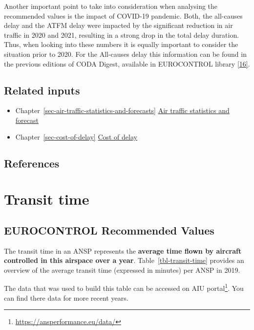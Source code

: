 \documentclass[
  11pt,
  a4paper,
]{book}
\providecommand{\tightlist}{%
  \setlength{\itemsep}{0pt}\setlength{\parskip}{0pt}}\usepackage{longtable,booktabs,array}
\DeclareRobustCommand{\href}[2]{#2\footnote{\url{#1}}}
\begin{document}
Another important point to take into consideration when analysing the
recommended values is the impact of COVID-19 pandemic. Both, the
all-causes delay and the ATFM delay were impacted by the significant
reduction in air traffic in 2020 and 2021, resulting in a strong drop in
the total delay duration. Thus, when looking into these numbers it is
equally important to consider the situation prior to 2020. For the
All-causes delay this information can be found in the previous editions
of CODA Digest, available in EUROCONTROL library
\protect\hyperlink{ref-ectllibrary}{{[}16{]}}.

\hypertarget{related-inputs-3}{%
\section{Related inputs}\label{related-inputs-3}}

\begin{itemize}
\tightlist
\item
  Chapter~\ref{sec-air-traffic-statistics-and-forecasts}
  \protect\hyperlink{sec-air-traffic-statistics-and-forecasts}{Air
  traffic statistics and forecast}
\item
  Chapter~\ref{sec-cost-of-delay}
  \protect\hyperlink{sec-cost-of-delay}{Cost of delay}
\end{itemize}

\hypertarget{references-4}{%
\section{References}\label{references-4}}

\hypertarget{sec-transit-time}{%
\chapter{Transit time}\label{sec-transit-time}}

\hypertarget{eurocontrol-recommended-values-2}{%
\section{EUROCONTROL Recommended
Values}\label{eurocontrol-recommended-values-2}}

The transit time in an ANSP represents the \textbf{average time flown by
aircraft controlled in this airspace over a year}.
Table~\ref{tbl-transit-time} provides an overview of the average transit
time (expressed in minutes) per ANSP in 2019.

The data that was used to build this table can be accessed on
\href{https://ansperformance.eu/data/}{AIU portal}. You can find there
data for more recent years.
\end{document}
